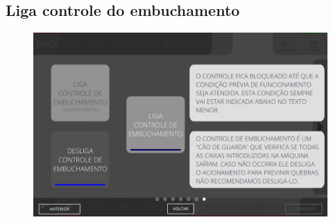 \newpage
\thispagestyle{fancy}
\vspace*{40 pt}
\subsection{Liga controle do embuchamento}
\vspace*{\fill}
\begin{figure}[h]
    \centering
    \includegraphics[width=576 px,height=360 px]{src/imagesICV/02-machine/8.png}
\end{figure}
\vspace*{\fill}

